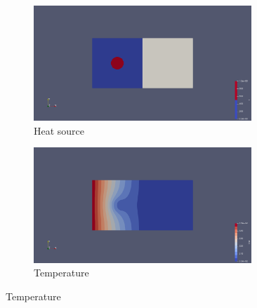 \documentclass{article}
\begin{document}
\begin{enumerate}[4.1]
	\begin{figure}[h]
		\centering
		\begin{subfigure}{\textwidth}
			\centering
			\includegraphics[width=0.9\textwidth]{S.png}
			\caption{Heat source}
		\end{subfigure}
		\begin{subfigure}{\textwidth}
			\centering
			\includegraphics[width=0.9\textwidth]{T.png}
			\caption{Temperature}
		\end{subfigure}
	\end{figure}
	
	
\end{enumerate}
\end{document}
